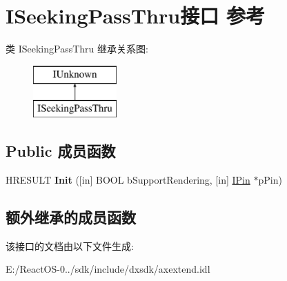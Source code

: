 \hypertarget{interface_i_seeking_pass_thru}{}\section{I\+Seeking\+Pass\+Thru接口 参考}
\label{interface_i_seeking_pass_thru}
类 I\+Seeking\+Pass\+Thru 继承关系图\+:\begin{figure}[H]
\begin{center}
\leavevmode
\includegraphics[height=2.000000cm]{interface_i_seeking_pass_thru}
\end{center}
\end{figure}
\subsection*{Public 成员函数}
\begin{DoxyCompactItemize}
\item 
\mbox{\label{interface_i_seeking_pass_thru_a3f985ee1e4a22ad468043682b2abab25}} 
H\+R\+E\+S\+U\+LT {\bfseries Init} (\mbox{[}in\mbox{]} B\+O\+OL b\+Support\+Rendering, \mbox{[}in\mbox{]} \hyperlink{interface_i_pin}{I\+Pin} $\ast$p\+Pin)
\end{DoxyCompactItemize}
\subsection*{额外继承的成员函数}


该接口的文档由以下文件生成\+:\begin{DoxyCompactItemize}
\item 
E\+:/\+React\+O\+S-\/0../sdk/include/dxsdk/axextend.\+idl\end{DoxyCompactItemize}
